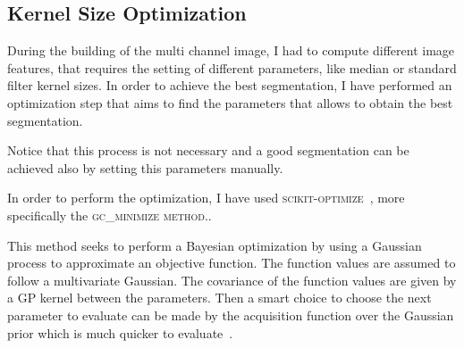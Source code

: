 \documentclass{standalone}
\begin{document}
	\subsection{Kernel Size Optimization}
	
	During the building of the multi channel image, I had to compute different image features, that requires the setting of different parameters, like median or standard filter kernel sizes. In order to achieve the best segmentation, I have performed an optimization step that aims to find the parameters that allows to obtain the best segmentation. 
	
	Notice that this process is not necessary and a good segmentation can be achieved also by setting this parameters manually.

	In order to perform the optimization, I have used \textsc{scikit-optimize}~\cite{skopt}, more specifically the \textsc{gc\_minimize method.}.
	
	This method seeks to perform a Bayesian optimization by using a Gaussian process to approximate an objective function. The function values are assumed to follow a multivariate Gaussian. The covariance of the function values are given by a GP kernel between the parameters. Then a smart choice to choose the next parameter to evaluate can be made by the acquisition function over the Gaussian prior which is much quicker to evaluate~\cite{skopt}.
\end{document}
